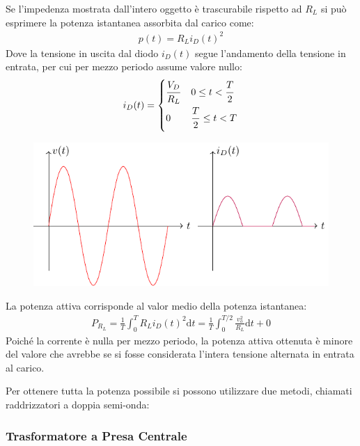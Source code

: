\documentclass{article}
\newcommand{\df}{\mathrm{d}}
\numberwithin{equation}{subsection}
\begin{document}
Se l'impedenza mostrata dall'intero oggetto è trascurabile rispetto ad $R_L$ si può esprimere la potenza istantanea assorbita dal carico come:
\begin{gather*}
    p(t)=R_Li_D(t)^2
\end{gather*}
Dove la tensione in uscita dal diodo $i_D(t)$ segue l'andamento della tensione in entrata, per cui per mezzo periodo assume valore nullo:
\begin{gather*}
    i_D(t)=\begin{cases}
        \displaystyle\frac{\strut V_D}{\strut R_L} &0\leq t<\displaystyle\frac{\strut T}{\strut 2}\\
        0& \displaystyle\frac{\strut T}{\strut 2}\leq t<T
    \end{cases}
\end{gather*}
\begin{figure}[H]%
    \centering
    \includegraphics{andamento-corrente-alimentatore-diodo.pdf}%
    \label{fig:andamento-corrente-alimentatore-diodo}
\end{figure}
La potenza attiva corrisponde al valor medio della potenza istantanea:
\begin{gather*}
    P_{R_L}=\displaystyle\frac{1}{T}\int_0^TR_Li_D(t)^2\df t=\frac{1}{T}\int_0^{T/2}\frac{v_o^2}{R_L}\df t+0
\end{gather*}
Poiché la corrente è nulla per mezzo periodo, la potenza attiva ottenuta è minore del valore che avrebbe se si fosse considerata l'intera tensione alternata 
in entrata al carico. 


Per ottenere tutta la potenza possibile si possono utilizzare due metodi, chiamati raddrizzatori a doppia semi-onda: 

\subsubsection{Trasformatore a Presa Centrale}
\end{document}

